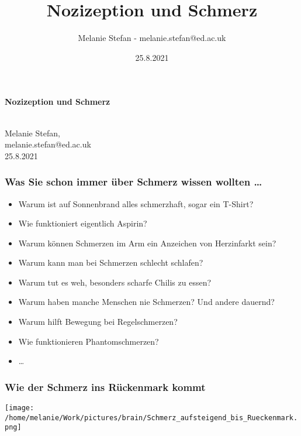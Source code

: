 \documentclass{beamer}
\title[Nozizeption]{Nozizeption und Schmerz}
\author[melanie.stefan@ed.ac.uk]{Melanie Stefan - melanie.stefan@ed.ac.uk}
\date{25.8.2021}
\begin{document}
 

{
\begin{frame}[plain]


\begin{Large}\textbf{Nozizeption und Schmerz}
\end{Large} \\[3cm]

Melanie Stefan, \\

melanie.stefan@ed.ac.uk \\


25.8.2021 

\vfill


\end{frame}
}

\begin{frame}
\frametitle{Was Sie schon immer über Schmerz wissen wollten \dots}
\pause

\begin{itemize}
\item
Warum ist auf Sonnenbrand alles schmerzhaft, sogar ein T-Shirt?
\item
Wie funktioniert eigentlich Aspirin? 
\item
Warum können Schmerzen im Arm ein Anzeichen von Herzinfarkt sein? 
\item
Warum kann man bei Schmerzen schlecht schlafen? 
\item
Warum tut es weh, besonders scharfe Chilis zu essen?
\item
Warum haben manche Menschen nie Schmerzen? Und andere dauernd?
\item
Warum hilft Bewegung bei Regelschmerzen? 
\item
Wie funktionieren Phantomschmerzen?  
\item
\dots 
\end{itemize}


\end{frame}




\begin{frame}
\frametitle{Wie der Schmerz ins Rückenmark kommt}

\pause 
\begin{center}
\texttt{[image: /home/melanie/Work/pictures/brain/Schmerz\_aufsteigend\_bis\_Rueckenmark.png]}
\end{center}

\end{frame}
\end{document}
